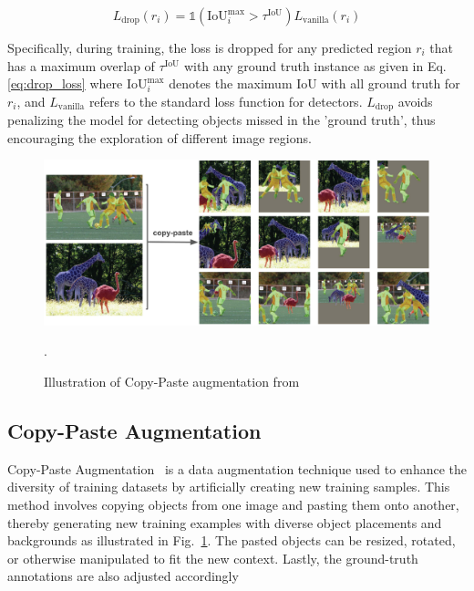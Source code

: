\begin{equation}
	\label{eq:drop_loss}
L_{\text{drop}}(r_i) = \mathds{1}(\text{IoU}_i^{\text{max}} > \tau^{\text{IoU}}) L_{\text{vanilla}}(r_i)
\end{equation}

Specifically, during training, the loss is dropped for any predicted region \( r_i \) that has a maximum overlap of \( \tau^{\text{IoU}} \) with any ground truth instance as given in Eq. \ref{eq:drop_loss} where \(\text{IoU}_i^{\text{max}}\) denotes the maximum IoU with all ground truth for \( r_i \), and \( L_{\text{vanilla}} \) refers to the standard loss function for detectors. \( L_{\text{drop}} \) avoids penalizing the model for detecting objects missed in the 'ground truth', thus encouraging the exploration of different image regions.

\begin{figure}
	\centering
	\includegraphics[width=1.0\textwidth]{Images/main/copy-paste.png}
	\caption[\textbf{Copy-Paste Augmentation}]{Illustration of Copy-Paste augmentation from~\cite{ghiasi2021simplecopypastestrongdata}}.
	\label{fig:copy_paste_aug}
\end{figure}

\subsection{Copy-Paste Augmentation}
Copy-Paste Augmentation~\cite{ghiasi2021simplecopypastestrongdata} is a data augmentation technique used to enhance the diversity of training datasets by artificially creating new training samples. This method involves copying objects from one image and pasting them onto another, thereby generating new training examples with diverse object placements and backgrounds as illustrated in Fig.~\ref{fig:copy_paste_aug}. The pasted objects can be resized, rotated, or otherwise manipulated to fit the new context. Lastly, the ground-truth annotations are also adjusted accordingly

